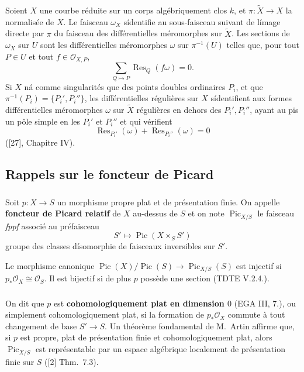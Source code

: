 \documentclass{amsart}
\theoremstyle{plain}
\theoremstyle{remark}
\DeclareMathOperator{\Pic}{Pic}
\DeclareMathOperator{\Res}{Res}
\newcommand{\cO}{\mathcal{O}}
\begin{document}
\subsubsection{}
Soient $X$ une courbe r\'eduite sur un corps alg\'ebriquement clos $k$, et
$\pi: \widetilde{X} \to X$ la normalis\'ee de $X$. Le faisceau $\omega_X$ s\'identifie au
sous-faisceau suivant de l\'image directe par $\pi$ du faisceau des diff\'erentielles
m\'eromorphes sur $\widetilde{X}$. Les sections de $\omega_X$ sur $U$ sont les
diff\'erentielles m\'eromorphes $\omega$ sur $\pi^{-1}(U)$ telles que, pour tout $P \in U$
et tout $f \in \cO_{X,P}$,
\[
\sum_{Q \mapsto P} \Res_Q(f\omega) = 0.
\]
Si $X$ n\'a comme singularit\'es que des points doubles ordinaires $P_i$, et que
$\pi^{-1}(P_i) = \{P_i', P_i''\}$, les diff\'erentielles r\'eguli\`eres sur $X$ s\'identifient aux
formes diff\'erentielles m\'eromorphes $\omega$ sur $\widetilde{X}$ r\'eguli\`eres en dehors des
$P_i', P_i''$, ayant au pis un p\^ole simple en les $P_i'$ et $P_i''$ et qui v\'erifient
\[
\Res_{P_i'}(\omega) + \Res_{P_i''}(\omega) = 0
\]
([27], Chapitre IV).

\subsection{Rappels sur le foncteur de Picard}

\subsubsection{}
Soit $p: X \to S$ un morphisme propre plat et de pr\'esentation finie. On appelle
\textbf{foncteur de Picard relatif} de $X$ au-dessus de $S$ et on note $\Pic_{X/S}$ le faisceau
\emph{fppf} associ\'e au pr\'efaisceau
\begin{equation}
S' \mapsto \Pic(X \times_S S')
\end{equation}
groupe des classes d\'isomorphie de faisceaux inversibles sur $S'$.

Le morphisme canonique $\Pic(X)/\Pic(S) \to \Pic_{X/S}(S)$ est injectif si
$p_* \cO_X \cong \cO_S$. Il est bijectif si de plus $p$ poss\`ede une section
(TDTE V.2.4.).

\subsubsection{}
On dit que $p$ est \textbf{cohomologiquement plat en dimension $0$} (EGA III, 7.),
ou simplement cohomologiquement plat, si la formation de $p_* \cO_X$ commute \`a tout
changement de base $S' \to S$. Un th\'eor\`eme fondamental de M.~Artin affirme que,
si $p$ est propre, plat de pr\'esentation finie et cohomologiquement plat, alors
$\Pic_{X/S}$ est repr\'esentable par un espace alg\'ebrique localement de pr\'esentation
finie sur $S$ ([2] Thm.~7.3).
\end{document}
